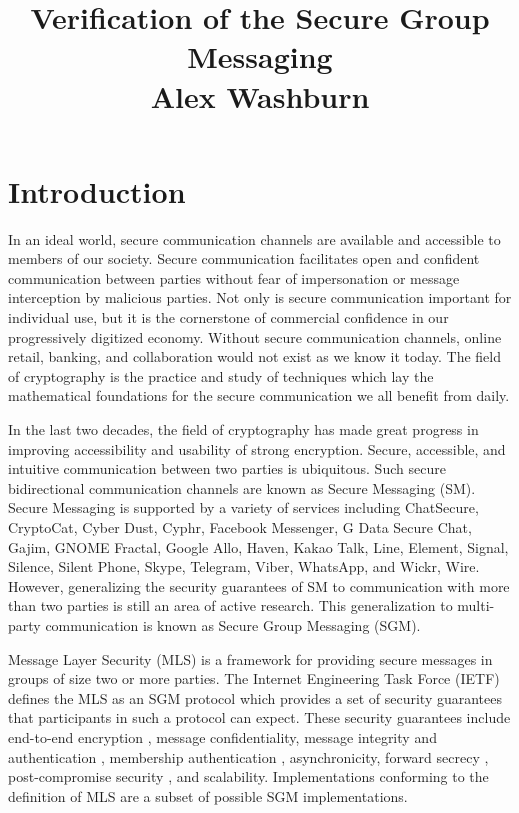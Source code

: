 \documentclass[12pt,twocolumn]{article}
\begin{document}
	
	\author{}
	\date{}
	\title{\vspace{-8ex} \textbf{Verification of the Secure Group Messaging}\\ \Large Alex Washburn\vspace{-7ex}}
	\maketitle
	\thispagestyle{plain}
	
	
	\section*{Introduction}
	
	In an ideal world, secure communication channels are available and accessible to members of our society.
	Secure communication facilitates open and confident communication between parties without fear of impersonation or message interception by malicious parties.
	Not only is secure communication important for individual use, but it is the cornerstone of commercial confidence in our progressively digitized economy.
	Without secure communication channels, online retail, banking, and collaboration would not exist as we know it today.
	The field of cryptography is the practice and study of techniques which lay the mathematical foundations for the secure communication we all benefit from daily.
	
	In the last two decades, the field of cryptography has made great progress in improving accessibility and usability of strong encryption.
	Secure, accessible, and intuitive communication between two parties is ubiquitous.
	Such secure bidirectional communication channels are known as Secure Messaging (SM).
	Secure Messaging is supported by a variety of services including ChatSecure, CryptoCat, Cyber Dust, Cyphr, Facebook Messenger, G Data Secure Chat, Gajim, GNOME Fractal, Google Allo, Haven, Kakao Talk, Line, Element, Signal, Silence, Silent Phone, Skype, Telegram, Viber, WhatsApp, and Wickr, Wire.
	However, generalizing the security guarantees of SM to communication with more than two parties is still an area of active research.
	This generalization to multi-party communication is known as Secure Group Messaging (SGM).
	
	Message Layer Security (MLS) \cite{Omara2020} is a framework for providing secure messages in groups of size two or more parties.
	The Internet Engineering Task Force (IETF) defines the MLS as an SGM protocol which provides a set of security guarantees that participants in such a protocol can expect.
	These security guarantees include end-to-end encryption \cite{padlipsky1978limitations}, message confidentiality, message integrity \cite{voydock1983security} and authentication \cite{jueneman1983message}, membership authentication \cite{chaum1985showing}, asynchronicity, forward secrecy \cite{gunther1989identity}, post-compromise security \cite{cohn2016post}, and scalability.
	Implementations conforming to the definition of MLS are a subset of possible SGM implementations.
	
\end{document}
